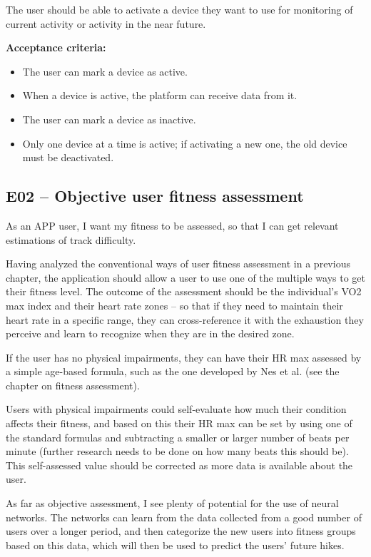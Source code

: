 The user should be able to activate a device they want to use for monitoring of current activity or activity in the near future.

\textbf{Acceptance criteria:}
\begin{itemize}
    \item The user can mark a device as active.
    \item When a device is active, the platform can receive data from it.
    \item The user can mark a device as inactive.
    \item Only one device at a time is active; if activating a new one, the old device must be deactivated.
\end{itemize}    
\subsection*{E02 -- Objective user fitness assessment}
As an APP user, I want my fitness to be assessed, so that I can get relevant estimations of track difficulty.

Having analyzed the conventional ways of user fitness assessment in a previous chapter, the application should allow a user to use one of the multiple ways to get their fitness level.
The outcome of the assessment should be the individual's VO2 max index and their heart rate zones -- so that if they need to maintain their heart rate in a specific range, they can cross-reference it with the exhaustion they perceive and learn to recognize when they are in the desired zone.

If the user has no physical impairments, they can have their HR max assessed by a simple age-based formula, such as the one developed by Nes et al. (see the chapter on fitness assessment).

Users with physical impairments could self-evaluate how much their condition affects their fitness, and based on this their HR max can be set by using one of the standard formulas and subtracting a smaller or larger number of beats per minute (further research needs to be done on how many beats this should be).
This self-assessed value should be corrected as more data is available about the user.

As far as objective assessment, I see plenty of potential for the use of neural networks.
The networks can learn from the data collected from a good number of users over a longer period, and then categorize the new users into fitness groups based on this data, which will then be used to predict the users' future hikes.

